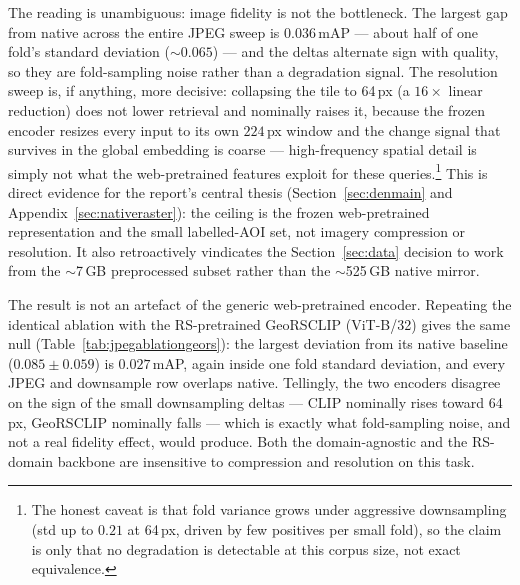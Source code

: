 \documentclass{article}
\begin{document}
\begin{appendices}
The reading is unambiguous: image fidelity is not the bottleneck. The largest gap
from native across the entire JPEG sweep is $0.036$\,mAP --- about half of one
fold's standard deviation ($\sim$$0.065$) --- and the deltas alternate sign with
quality, so they are fold-sampling noise rather than a degradation signal. The
resolution sweep is, if anything, more decisive: collapsing the tile to 64\,px (a
$16\times$ linear reduction) does not lower retrieval and nominally raises it,
because the frozen encoder resizes every input to its own $224$\,px window and the
change signal that survives in the global embedding is coarse --- high-frequency
spatial detail is simply not what the web-pretrained features exploit for these
queries.\footnote{The honest caveat is that fold variance grows under aggressive
downsampling (std up to $0.21$ at 64\,px, driven by few positives per small fold),
so the claim is only that no degradation is detectable at this corpus size, not
exact equivalence.} This is direct evidence for the report's central thesis
(Section~\ref{sec:denmain} and Appendix~\ref{sec:nativeraster}): the ceiling is the frozen
web-pretrained representation and the small labelled-AOI set, not imagery
compression or resolution. It also retroactively vindicates the
Section~\ref{sec:data} decision to work from the $\sim$7\,GB preprocessed subset
rather than the $\sim$525\,GB native mirror.

The result is not an artefact of the generic web-pretrained encoder. Repeating the
identical ablation with the RS-pretrained GeoRSCLIP (ViT-B/32) gives the same null
(Table~\ref{tab:jpegablationgeors}): the largest deviation from its native baseline
($0.085\pm0.059$) is $0.027$\,mAP, again inside one fold standard deviation, and
every JPEG and downsample row overlaps native. Tellingly, the two encoders disagree
on the sign of the small downsampling deltas --- CLIP nominally rises toward
64\,px, GeoRSCLIP nominally falls --- which is exactly what fold-sampling noise, and
not a real fidelity effect, would produce. Both the domain-agnostic and the
RS-domain backbone are insensitive to compression and resolution on this task.


\end{appendices}
\end{document}
